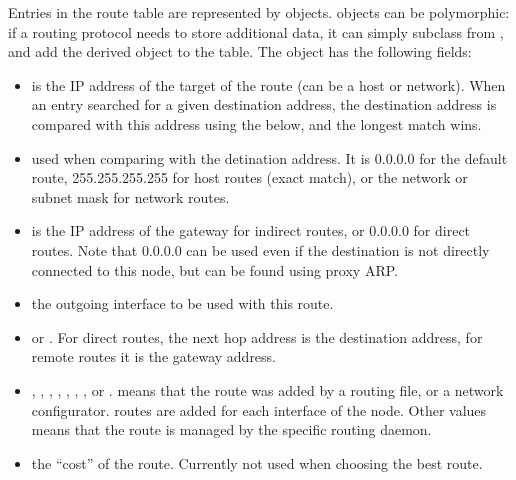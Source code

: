 Entries in the route table are represented by  objects.
 objects can be polymorphic: if a routing protocol needs
to store additional data, it can simply subclass from ,
and add the derived object to the table. The  object
has the following fields:
\begin{itemize}
  \item {} is the IP address of the target of the route (can be a host or network).
                   When an entry searched for a given destination address, the destination
                   address is compared with this  address using the 
                   below, and the longest match wins.
  \item {} used when comparing  with the detination address.
                     It is 0.0.0.0 for the default route, 255.255.255.255 for
                     host routes (exact match), or the network or subnet mask
                     for network routes.
  \item {} is the IP address of the gateway for indirect routes, or
                      0.0.0.0 for direct routes. Note that 0.0.0.0 can be used
                      even if the destination is not directly connected to this
                      node, but can be found using proxy ARP.
  \item {} the outgoing interface to be used with this route.
  \item {}  or . For direct routes, the next hop
                   address is the destination address, for remote routes it is
                   the gateway address.
  \item {} , , , ,
        , , , or .  means
        that the route was added by a routing file, or a network configurator.
         routes are added for each interface of the node.
        Other values means that the route is managed by the specific routing
        daemon.
  \item {} the ``cost'' of the route. Currently not used when choosing
                     the best route.
\end{itemize}


